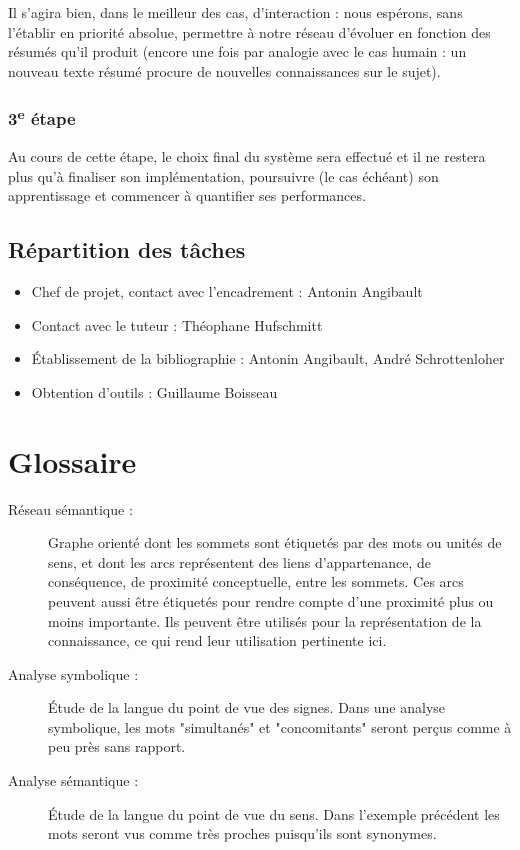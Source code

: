 \documentclass{article}           %
\begin{document}
Il s'agira bien, dans le meilleur des cas, d'interaction : nous espérons, sans l'établir en priorité absolue, permettre à notre réseau d'évoluer en fonction des résumés qu'il produit (encore une fois par analogie avec le cas humain : un nouveau texte résumé procure de nouvelles connaissances sur le sujet).

\subsubsection{3\textsuperscript{e} étape}

Au cours de cette étape, le choix final du système sera effectué et il ne restera plus qu'à finaliser son implémentation, poursuivre (le cas échéant) son apprentissage et commencer à quantifier ses performances.


\subsection{Répartition des tâches}%
\begin{itemize}
	\item Chef de projet, contact avec l'encadrement : Antonin Angibault
	\item Contact avec le tuteur : Théophane Hufschmitt
	\item Établissement de la bibliographie : Antonin Angibault, André Schrottenloher
	\item Obtention d'outils : Guillaume Boisseau
\end{itemize}

\section{Glossaire}

\begin{description}
	\item[Réseau sémantique :]Graphe orienté dont les sommets sont étiquetés par des mots ou unités de sens, et dont les arcs représentent des liens d'appartenance, de conséquence, de proximité conceptuelle, entre les sommets. Ces arcs peuvent aussi \^{e}tre étiquetés pour rendre compte d'une proximité plus ou moins importante. Ils peuvent \^{e}tre utilisés pour la représentation de la connaissance, ce qui rend leur utilisation pertinente ici.
	\item[Analyse symbolique :]Étude de la langue du point de vue des signes. Dans une analyse symbolique, les mots "simultanés" et "concomitants" seront perçus comme à peu près sans rapport.
	\item[Analyse sémantique :]Étude de la langue du point de vue du sens. Dans l'exemple précédent les mots seront vus comme très proches puisqu'ils sont synonymes.
\end{description}
\end{document}

